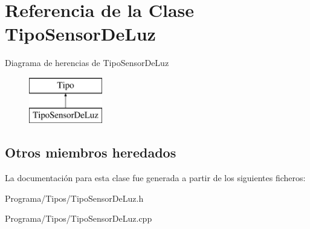\hypertarget{class_tipo_sensor_de_luz}{\section{Referencia de la Clase Tipo\-Sensor\-De\-Luz}
\label{class_tipo_sensor_de_luz}
}
Diagrama de herencias de Tipo\-Sensor\-De\-Luz\begin{figure}[H]
\begin{center}
\leavevmode
\includegraphics[height=2.000000cm]{class_tipo_sensor_de_luz}
\end{center}
\end{figure}
\subsection*{Otros miembros heredados}


La documentación para esta clase fue generada a partir de los siguientes ficheros\-:\begin{DoxyCompactItemize}
\item 
Programa/\-Tipos/Tipo\-Sensor\-De\-Luz.\-h\item 
Programa/\-Tipos/Tipo\-Sensor\-De\-Luz.\-cpp\end{DoxyCompactItemize}
